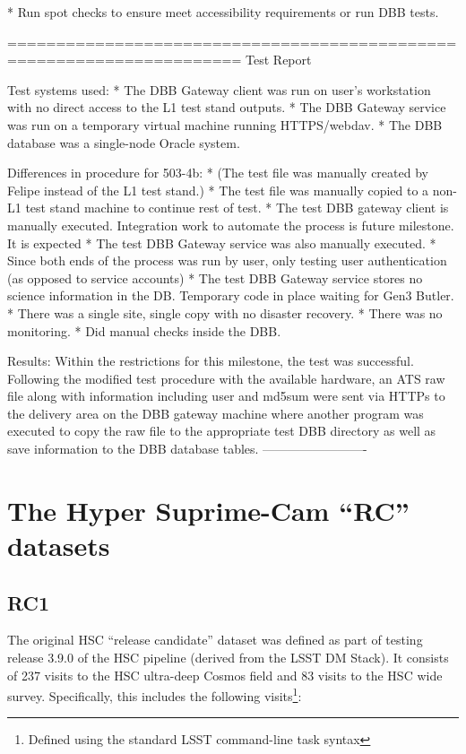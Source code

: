 \documentclass[DM,lsstdraft,STS,toc]{lsstdoc}
\begin{document}
* Run spot checks to ensure meet accessibility requirements or
 run DBB tests.


======================================================================
Test Report

Test systems used:
* The DBB Gateway client was run on user's workstation with no
direct access to the L1 test stand outputs.
* The DBB Gateway service was run on a temporary virtual machine
running HTTPS/webdav.
* The DBB database was a single-node Oracle system.

Differences in procedure for 503-4b:
* (The test file was manually created by Felipe instead of the L1
test stand.)
* The test file was manually copied to a non-L1 test stand machine
to continue rest of test.
* The test DBB gateway client is manually executed.  Integration
work to automate the process is future milestone.  It is expected
* The test DBB Gateway service was also manually executed.
* Since both ends of the process was run by user, only testing user
authentication (as opposed to service accounts)
* The test DBB Gateway service stores no science information in the
DB.  Temporary code in place waiting for Gen3 Butler.
* There was a single site, single copy with no disaster recovery.
* There was no monitoring.
* Did manual checks inside the DBB.

Results:
Within the restrictions for this milestone, the test was successful.
Following the modified test procedure with the available hardware,
an ATS raw file along with information including user and md5sum were
sent via HTTPs to the delivery area on the DBB gateway machine where
another program was executed to copy the raw file to the appropriate
test DBB directory as well as save information to the DBB database
tables.
-------------------------
\appendix

\section{The Hyper Suprime-Cam ``RC'' datasets}

\subsection{RC1}

The original HSC ``release candidate'' dataset was defined as part of testing
release 3.9.0 of the HSC pipeline (derived from the LSST DM Stack). It
consists of 237 visits to the HSC ultra-deep Cosmos field and 83 visits to the
HSC wide survey. Specifically, this includes the following
visits\footnote{Defined using the standard LSST command-line task syntax}:
\end{document}
